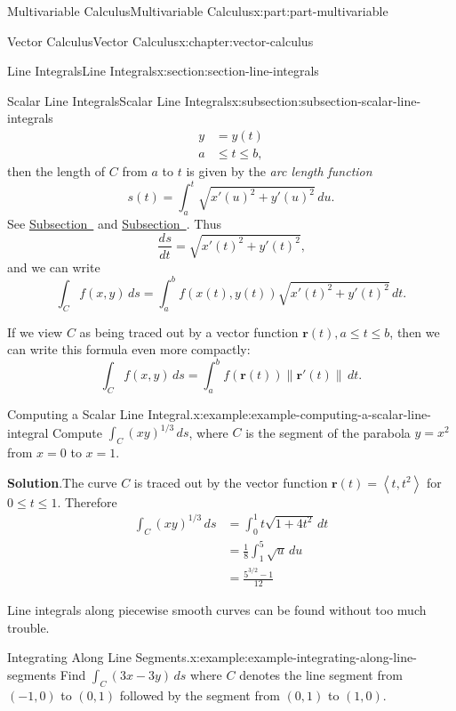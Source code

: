\documentclass[twoside,10pt,]{tufte-book}
\newcommand{\blocktitlefont}{\relax}
\numberwithin{equation}{part}
\newcommand{\vb}[1]{\mathbf{#1}}
\newcommand{\dv}[3][]{\dfrac{d^{#1} #2}{d #3^{#1}}}
\newcommand{\norm}[1]{\left\| #1 \right\|}
\newcommand{\dotprod}[1]{\left\langle #1 \right\rangle}
\newcommand{\amp}{&}
\begin{document}
\begin{partptx}{Multivariable Calculus}{}{Multivariable Calculus}{}{}{x:part:part-multivariable}
\begin{chapterptx}{Vector Calculus}{}{Vector Calculus}{}{}{x:chapter:vector-calculus}
\begin{sectionptx}{Line Integrals}{}{Line Integrals}{}{}{x:section:section-line-integrals}
\begin{subsectionptx}{Scalar Line Integrals}{}{Scalar Line Integrals}{}{}{x:subsection:subsection-scalar-line-integrals}
\begin{align*}
y \amp = y(t) \\
a \amp \leq t\leq b \text{,}
\end{align*}
then the length of \(C\) from \(a\) to \(t\) is given by the \emph{arc length function}%
\begin{equation*}
s(t) = \int_{a}^{t}\sqrt{x'(u)^{2} + y'(u)^{2}}\,du\text{.}
\end{equation*}
See \hyperref[x:subsection:subsection-arc-length-parametric-curves]{Subsection~} and \hyperref[x:subsection:subsection-arc-length]{Subsection~}. Thus%
\begin{equation*}
\dv{s}{t} = \sqrt{x'(t)^{2} + y'(t)^{2}}\text{,}
\end{equation*}
and we can write%
\begin{equation*}
\int_{C}f(x,y)\,ds = \int_{a}^{b}f(x(t),y(t))\sqrt{x'(t)^{2} + y'(t)^{2}}\,dt\text{.}
\end{equation*}
%
\par
If we view \(C\) as being traced out by a vector function \(\vb{r}(t), a\leq t\leq b\), then we can write this formula even more compactly:%
\begin{equation*}
\int_{C}f(x,y)\,ds = \int_{a}^{b}f(\vb{r}(t))\norm{\vb{r}'(t)}\,dt\text{.}
\end{equation*}
%
\begin{example}{Computing a Scalar Line Integral.}{x:example:example-computing-a-scalar-line-integral}%
Compute \(\int_{C}(xy)^{1/3}\,ds\), where \(C\) is the segment of the parabola \(y = x^{2}\) from \(x = 0\) to \(x = 1\).%
\par\smallskip%
\noindent\textbf{\blocktitlefont Solution}.\hypertarget{g:solution:idm35150932176320}{}\quad{}The curve \(C\) is traced out by the vector function \(\vb{r}(t) = \dotprod{t,t^{2}}\) for \(0\leq t\leq 1\). Therefore%
\begin{align*}
\int_{C}(xy)^{1/3}\,ds \amp = \int_{0}^{1} t\sqrt{1 + 4t^{2}}\,dt \\
\amp = \frac{1}{8}\int_{1}^{5}\sqrt{u}\,du \\
\amp = \frac{5^{3/2} - 1}{12} 
\end{align*}
%
\end{example}
Line integrals along piecewise smooth curves can be found without too much trouble.%
\begin{example}{Integrating Along Line Segments.}{x:example:example-integrating-along-line-segments}%
Find \(\int_{C}(3x - 3y)\,ds\) where \(C\) denotes the line segment from \((-1,0)\) to \((0,1)\) followed by the segment from \((0,1)\) to \((1,0)\).%

\end{example}
\end{subsectionptx}
\end{sectionptx}
\end{chapterptx}
\end{partptx}
\end{document}
